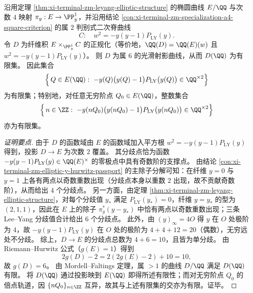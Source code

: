 \begin{conclusion}\label{con:xi-terminal-zm-discriminant-square-elliptic-orbit-finiteness}
沿用定理 \ref{thm:xi-terminal-zm-leyang-elliptic-structure} 的椭圆曲线 \(E/\QQ\) 与次数 \(4\) 映射 \(\pi_y:E\to\PP^{1}_{y}\)，并沿用结论 \ref{con:xi-terminal-zm-specialization-a4-square-criterion} 的属 \(2\) 判别式二次脊曲线
\[
C:\quad w^{2}=-y(y-1)P_{\mathrm{LY}}(y).
\]
令 \(D\) 为纤维积 \(E\times_{\PP^{1}_{y}} C\) 的正规化（等价地，\(\QQ(D)=\QQ(E)(w)\) 且 \(w^{2}=-y(y-1)P_{\mathrm{LY}}(y)\)）。
则 \(D\) 为属 \(6\) 的光滑射影曲线，从而 \(D(\QQ)\) 为有限集。
因此集合
\[
\Bigl\{\,Q\in E(\QQ):\ -y(Q)\bigl(y(Q)-1\bigr)P_{\mathrm{LY}}\bigl(y(Q)\bigr)\in \QQ^{\times 2}\Bigr\}
\]
为有限集；特别地，对任意无穷阶点 \(Q_{0}\in E(\QQ)\)，整数集合
\[
\Bigl\{\,n\in\ZZ:\ -y(nQ_{0})\bigl(y(nQ_{0})-1\bigr)P_{\mathrm{LY}}\bigl(y(nQ_{0})\bigr)\in \QQ^{\times 2}\Bigr\}
\]
亦为有限集。
\end{conclusion}
\begin{proof}[证明要点]
由于 \(D\) 的函数域由 \(E\) 的函数域加入平方根 \(w^{2}=-y(y-1)P_{\mathrm{LY}}(y)\) 得到，投影 \(D\to E\) 为次数 \(2\) 覆盖。
其分歧点恰为函数 \(-y(y-1)P_{\mathrm{LY}}(y)\in\QQ(E)^{\times}\) 的零极点中具有奇数阶的支撑点。
由结论 \ref{con:xi-terminal-zm-elliptic-y-hurwitz-passport} 的主除子分解可知：在纤维 \(y=0\) 与 \(y=1\) 上各有两点以奇数重数出现（分歧点本身以重数 \(2\) 出现，故不贡献奇数阶），从而给出 \(4\) 个分歧点。
另一方面，由定理 \ref{thm:xi-terminal-zm-leyang-elliptic-structure}，对每个分歧值 \(y_{*}\) 满足 \(P_{\mathrm{LY}}(y_{*})=0\)，纤维 \(y=y_{*}\) 的型为 \((2,1,1)\)，因此在 \(E\) 上的除子 \(\pi_y^{*}(y-y_{*})\) 中恰有两点以奇数重数出现；三条 Lee--Yang 分歧值合计给出 \(6\) 个分歧点。
此外，由 \((y)_\infty=4O\) 得 \(y\) 在 \(O\) 处极阶为 \(4\)，故 \(-y(y-1)P_{\mathrm{LY}}(y)\) 在 \(O\) 处的极阶为 \(4+4+12=20\)（偶数），无穷远处不分歧。
综上，\(D\to E\) 的分歧点总数为 \(4+6=10\)，且皆为单分歧。
由 Riemann--Hurwitz 公式（\(g(E)=1\)）得到
\[
2g(D)-2=2(2g(E)-2)+10=10,
\]
故 \(g(D)=6\)。
由 Mordell--Faltings 定理，属 \(>1\) 的曲线 \(D/\QQ\) 满足 \(D(\QQ)\) 有限。
将 \(D(\QQ)\) 通过投影映到 \(E(\QQ)\) 即得所述有限性；而对无穷阶点 \(Q_0\) 的倍点轨道，因 \(\{nQ_0\}_{n\in\ZZ}\) 互异，故其与上述有限集的交亦为有限。证毕。
\end{proof}

